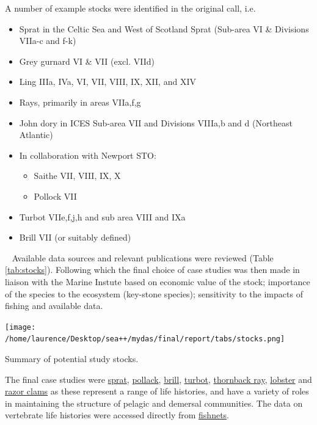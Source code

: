 A number of example stocks were identified in the original call, i.e.  

\begin{itemize}[labelindent=\parindent,noitemsep,topsep=0pt,parsep=0pt,partopsep=0pt]
 \item Sprat in the Celtic Sea and West of Scotland Sprat (Sub-area VI \& Divisions VIIa-c and f-k)
 \item Grey gurnard VI \& VII (excl. VIId)
 \item Ling IIIa, IVa, VI, VII, VIII, IX, XII, and XIV 
 \item Rays, primarily in areas VIIa,f,g 
 \item John dory in ICES Sub-area VII and Divisions VIIIa,b and d (Northeast Atlantic)
 \item In collaboration with Newport STO:
\begin{itemize} 
 \item Saithe VII, VIII, IX, X
 \item Pollock VII
\end{itemize}
\item Turbot VIIe,f,j,h and sub area VIII and IXa
\item Brill VII (or suitably defined)
\end{itemize}

~\newline
Available data sources and relevant publications were reviewed (Table \ref{tab:stocks}). Following which the final choice of case studies was then made in liaison with the Marine Instute based on economic value of the stock; importance of the species to the ecosystem (key-stone species); sensitivity to the impacts of fishing and available data.  

\begin{table}[h!]\centering\texttt{[image: /home/laurence/Desktop/sea++/mydas/final/report/tabs/stocks.png]}\caption{Summary of potential study stocks.}\label{tab:stocks}
\end{table}
 
 
The final case studies were 
\href{https://3o2y9wugzp1kfxr5hvzgzq-on.drv.tw/MyDas/tasks/2/sprat.html}{sprat}, 
\href{https://3o2y9wugzp1kfxr5hvzgzq-on.drv.tw/MyDas/tasks/2/pollack.html}{pollack}, 
\href{https://3o2y9wugzp1kfxr5hvzgzq-on.drv.tw/MyDas/tasks/2/brill.html}{brill}, 
\href{https://3o2y9wugzp1kfxr5hvzgzq-on.drv.tw/MyDas/tasks/2/turbot.html}{turbot}, 
\href{https://3o2y9wugzp1kfxr5hvzgzq-on.drv.tw/MyDas/tasks/2/ray.html}{thornback ray}, 
\href{https://3o2y9wugzp1kfxr5hvzgzq-on.drv.tw/MyDas/tasks/2/lobster.html}{lobster} and 
\href{https://3o2y9wugzp1kfxr5hvzgzq-on.drv.tw/MyDas/tasks/2/razor.html}{razor clams} as these represent a range of life histories, and have a variety of roles in maintaining the structure of pelagic and demersal communities. The data on vertebrate life histories were accessed directly from \href{https://3o2y9wugzp1kfxr5hvzgzq-on.drv.tw/MyDas/tasks/1/stocks.html}{fishnets}. 

